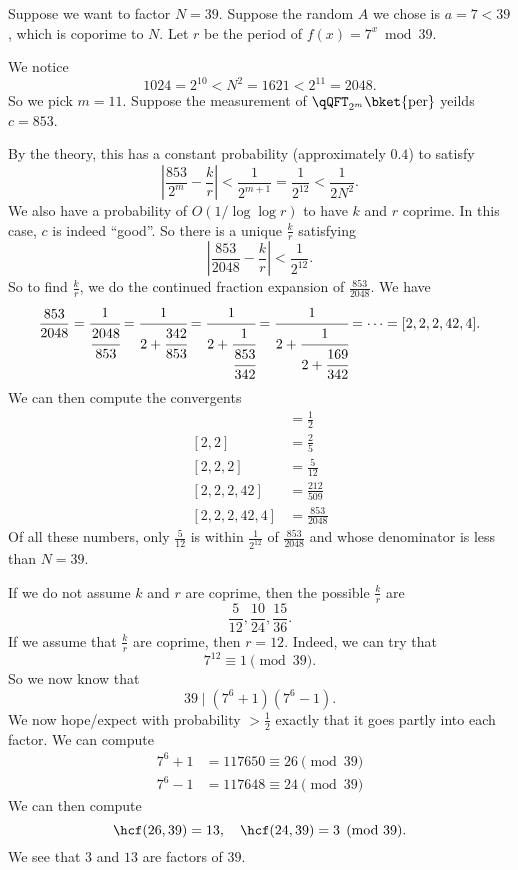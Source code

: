 \documentclass[a4paper]{article}
\begin{document}
\begin{eg}
  Suppose we want to factor $N = 39$. Suppose the random $A$ we chose is $a = 7 < 39$, which is coporime to $N$. Let $r$ be the period of $f(x) = 7^x \bmod 39$.

  We notice
  \[
    1024 = 2^{10} < N^2 = 1621 < 2^{11} = 2048.
  \]
  So we pick $m = 11$. Suppose the measurement of $\qQFT_{2^m}\bket{\mathrm{per}}$ yeilds $c = 853$.

  By the theory, this has a constant probability (approximately $0.4$) to satisfy
  \[
    \left|\frac{853}{2^m} - \frac{k}{r}\right| < \frac{1}{2^{m + 1}} = \frac{1}{2^{12}} < \frac{1}{2N^2}.
  \]
  We also have a probability of $O(1/\log \log r)$ to have $k$ and $r$ coprime. In this case, $c$ is indeed ``good''. So there is a unique $\frac{k}{r}$ satisfying
  \[
    \left|\frac{853}{2048} - \frac{k}{r}\right| < \frac{1}{2^{12}}.
  \]
  So to find $\frac{k}{r}$, we do the continued fraction expansion of $\frac{853}{2048}$. We have
  \[
    \frac{853}{2048} = \cfrac{1}{\cfrac{2048}{853}} = \cfrac{1}{2 + \cfrac{342}{853}} = \cfrac{1}{2 + \cfrac{1}{\cfrac{853}{342}}} = \cfrac{1}{2 + \cfrac{1}{2 + \cfrac{169}{342}}} = \cdots = [2, 2, 2, 42, 4].
  \]
  We can then compute the convergents
  \begin{align*}
    [2] &= \frac{1}{2}\\
    [2, 2] &= \frac{2}{5}\\
    [2, 2, 2] &= \frac{5}{12}\\
    [2, 2, 2, 42] &= \frac{212}{509}\\
    [2, 2, 2, 42, 4] &= \frac{853}{2048}
  \end{align*}
  Of all these numbers, only $\frac{5}{12}$ is within $\frac{1}{2^{12}}$ of $\frac{853}{2048}$ and whose denominator is less than $N = 39$.

  If we do not assume $k$ and $r$ are coprime, then the possible $\frac{k}{r}$ are
  \[
    \frac{5}{12}, \frac{10}{24}, \frac{15}{36}.
  \]
  If we assume that $\frac{k}{r}$ are coprime, then $r = 12$. Indeed, we can try that
  \[
    7^{12} \equiv 1 \pmod {39}.
  \]
  So we now know that
  \[
    39 \mid (7^6 + 1)(7^6 - 1).
  \]
  We now hope/expect with probability $>\frac{1}{2}$ exactly that it goes partly into each factor. We can compute
  \begin{align*}
    7^6 + 1 &= 117650 \equiv 26 \pmod {39}\\
    7^6 - 1 &= 117648 \equiv 24 \pmod {39}
  \end{align*}
  We can then compute
  \[
    \hcf(26, 39) = 13,\quad \hcf(24, 39) = 3 \pmod {39}.
  \]
  We see that $3$ and $13$ are factors of $39$.
\end{eg}
\end{document}
